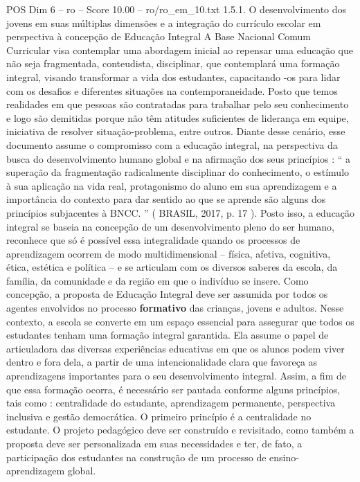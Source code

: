 \begin{textsample}{POS Dim 6 – ro – Score 10.00 – ro/ro\_em\_10.txt}  \label{ex:f6_pos_136}
1.5.1.
O desenvolvimento dos jovens em suas múltiplas dimensões e a integração do currículo escolar em perspectiva à concepção de Educação Integral A Base Nacional Comum Curricular visa contemplar uma abordagem inicial ao repensar uma educação que não seja fragmentada, conteudista, disciplinar, que contemplará uma formação integral, visando transformar a vida dos estudantes, capacitando -os para lidar com os desafios e diferentes situações na contemporaneidade.
Posto que temos realidades em que pessoas são contratadas para trabalhar pelo seu conhecimento e logo são demitidas porque não têm atitudes suficientes de liderança em equipe, iniciativa de resolver situação-problema, entre outros.
Diante desse cenário, esse documento assume o compromisso com a educação integral, na perspectiva da busca do desenvolvimento humano global e na afirmação dos seus princípios : “ a superação da fragmentação radicalmente disciplinar do conhecimento, o estímulo à sua aplicação na vida real, protagonismo do aluno em sua aprendizagem e a importância do contexto para dar sentido ao que se aprende são alguns dos princípios subjacentes à BNCC. ” ( BRASIL, 2017, p. 17 ).
Posto isso, a educação integral se baseia na concepção de um desenvolvimento pleno do ser humano, reconhece que só é possível essa integralidade quando os processos de aprendizagem ocorrem de modo multidimensional – física, afetiva, cognitiva, ética, estética e política – e se articulam com os diversos saberes da escola, da família, da comunidade e da região em que o indivíduo se insere.
Como concepção, a proposta de Educação Integral deve ser assumida por todos os agentes envolvidos no processo \textbf{formativo} das crianças, jovens e adultos.
Nesse contexto, a escola se converte em um espaço essencial para assegurar que todos os estudantes tenham uma formação integral garantida.
Ela assume o papel de articuladora das diversas experiências educativas em que os alunos podem viver dentro e fora dela, a partir de uma intencionalidade clara que favoreça as aprendizagens importantes para o seu desenvolvimento integral.
Assim, a fim de que essa formação ocorra, é necessário ser pautada conforme alguns princípios, tais como : centralidade do estudante, aprendizagem permanente, perspectiva inclusiva e gestão democrática.
O primeiro princípio é a centralidade no estudante.
O projeto pedagógico deve ser construído e revisitado, como também a proposta deve ser personalizada em suas necessidades e ter, de fato, a participação dos estudantes na construção de um processo de ensino-aprendizagem global.

\end{textsample}
